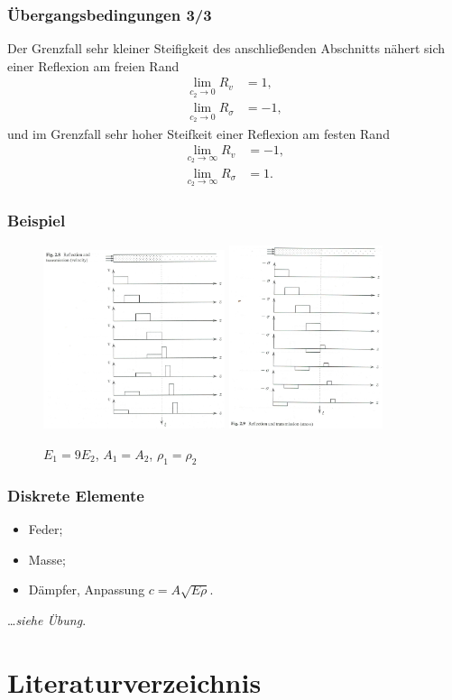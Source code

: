 \documentclass[hyperref={pdfpagemode=FullScreen, colorlinks=false}]{beamer}
\begin{document}
\begin{frame}
 \frametitle{Übergangsbedingungen 3/3}
Der Grenzfall sehr kleiner Steifigkeit des anschließenden Abschnitts nähert sich einer Reflexion am freien Rand
\begin{align*}
 \lim_{c_2 \to 0} R_v &= 1, \\
 \lim_{c_2 \to 0} R_\sigma &= -1,
\end{align*}
und im Grenzfall sehr hoher Steifkeit einer Reflexion am festen Rand
\begin{align*}
 \lim_{c_2 \to \infty} R_v &= -1 , \\
 \lim_{c_2 \to \infty} R_\sigma &= 1.
\end{align*}
\end{frame} 

\begin{frame}
 \frametitle{Beispiel}
\begin{figure}
\includegraphics[width=0.475\textwidth]{fig_pdf/transition_z_v}
\hfill
\includegraphics[width=0.4\textwidth]{fig_pdf/transition_z_sigma}
\caption*{$E_1=9E_2$, $A_1=A_2$, $\rho_1=\rho_2$ \cite{Verruijt2010}}
\end{figure}
\end{frame} 


\begin{frame}
 \frametitle{Diskrete Elemente}


 \begin{itemize}
  \item Feder;
  \item Masse;
  \item Dämpfer, Anpassung $c=A\sqrt{E\rho}$.
 \end{itemize}
\hfill \dots \textsl{siehe Übung}.
\end{frame} 


\section*{Literaturverzeichnis}

\begin{frame}[allowframebreaks]{}
	\printbibliography
\end{frame}
\end{document}
